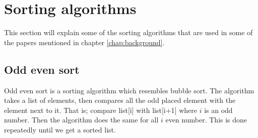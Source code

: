 \section{Sorting algorithms}
\label{app:sorting} This section will explain some of the sorting algorithms that are used in some of the papers mentioned in chapter \ref{chap:background}. 
\subsection{Odd even sort}
Odd even sort is a sorting algorithm which resembles bubble sort. The algorithm takes a list of elements, then compares all the odd placed element with the element next to it. That is; compare list[i] with list[i+1] where $i$ is an odd number. Then the algorithm does the same for all $i$ even number. This is done repeatedly until we get a sorted list.

